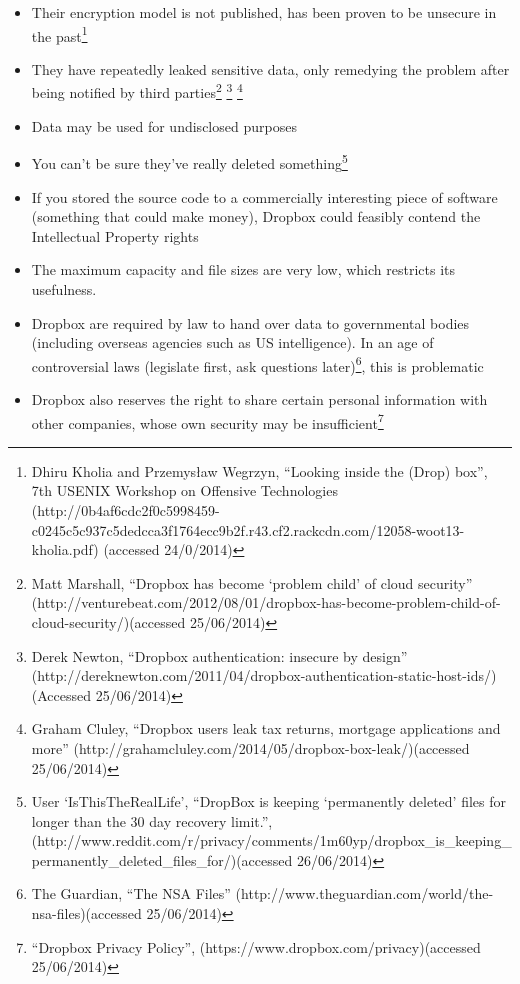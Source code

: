 \documentclass[12pt,a4paper,]{adreport}
\begin{document}
\begin{itemize}
\itemsep1pt\parskip0pt
\item
  Their encryption model is not published, has been proven to be
  unsecure in the past\footnote{Dhiru Kholia and Przemysław Wegrzyn,
    ``Looking inside the (Drop) box'', 7th USENIX Workshop on Offensive
    Technologies
    (http://0b4af6cdc2f0c5998459-c0245c5c937c5dedcca3f1764ecc9b2f.r43.cf2.rackcdn.com/12058-woot13-kholia.pdf)
    (accessed 24/0/2014)}
\item
  They have repeatedly leaked sensitive data, only remedying the problem
  after being notified by third parties\footnote{Matt Marshall,
    ``Dropbox has become `problem child' of cloud security''
    (http://venturebeat.com/2012/08/01/dropbox-has-become-problem-child-of-cloud-security/)(accessed
    25/06/2014)} \footnote{Derek Newton, ``Dropbox authentication:
    insecure by design''
    (http://dereknewton.com/2011/04/dropbox-authentication-static-host-ids/)(Accessed
    25/06/2014)} \footnote{Graham Cluley, ``Dropbox users leak tax
    returns, mortgage applications and more''
    (http://grahamcluley.com/2014/05/dropbox-box-leak/)(accessed
    25/06/2014)}
\item
  Data may be used for undisclosed purposes
\item
  You can't be sure they've really deleted something\footnote{User
    `IsThisTheRealLife', ``DropBox is keeping `permanently deleted'
    files for longer than the 30 day recovery limit.'',
    (http://www.reddit.com/r/privacy/comments/1m60yp/dropbox\_is\_keeping\_permanently\_deleted\_files\_for/)(accessed
    26/06/2014)}
\item
  If you stored the source code to a commercially interesting piece of
  software (something that could make money), Dropbox could feasibly
  contend the Intellectual Property rights
\item
  The maximum capacity and file sizes are very low, which restricts its
  usefulness.
\item
  Dropbox are required by law to hand over data to governmental bodies
  (including overseas agencies such as US intelligence). In an age of
  controversial laws (legislate first, ask questions later)\footnote{The
    Guardian, ``The NSA Files''
    (http://www.theguardian.com/world/the-nsa-files)(accessed
    25/06/2014)}, this is problematic
\item
  Dropbox also reserves the right to share certain personal information
  with other companies, whose own security may be insufficient\footnote{``Dropbox
    Privacy Policy'', (https://www.dropbox.com/privacy)(accessed
    25/06/2014)}
\end{itemize}
\end{document}
